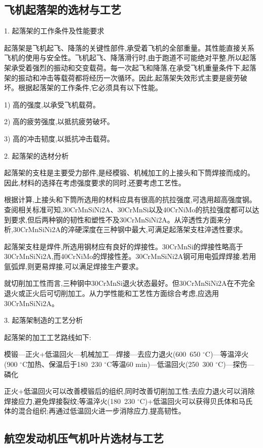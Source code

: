 \documentclass[UTF8]{ctexbook}
\newcommand{\◎}{\ensuremath{\bigcirc}}
\begin{document}
\subsection{飞机起落架的选材与工艺}

1. 起落架的工作条件及性能要求

起落架是飞机起飞、降落的关键性部件,承受着飞机的全部重量。其性能直接关系飞机的使用与安全性。飞机起飞、降落滑行时,由于跑道不可能绝对平整,所以起落架承受着强烈的振动和交变载荷。每一次起飞和降落,在承受飞机重量条件下,起落架的振动和冲击等载荷都将经历一次循环。因此,起落架失效形式主要是疲劳破坏。根据起落架的工作条件,它必须具有以下性能。

1) 高的强度,以承受飞机载荷。

2) 高的疲劳强度,以抵抗疲劳破坏。

3) 高的冲击韧度,以抵抗冲击载荷。

2. 起落架的选材分析

起落架的支柱是主要受力部件,是经模锻、机械加工的上接头和下筒焊接而成的。因此,材料的选择在考虑强度要求的同时,还要考虑工艺性。

根据计算,上接头和下筒所选用的材料应具有很高的抗拉强度,可选用超高强度钢。查阅相关标准可知,30CrMnSiNi2A、30CrMnSi以及40CrNiMo的抗拉强度都可以达到要求,但后两种钢的韧性和塑性不及30CrMnSiNi2A。从淬透性方面来分析,30CrMnSiNi2A的淬硬深度在三种钢中最大,可满足起落架支柱淬透性要求。

起落架支柱是焊件,所选用钢材应有良好的焊接性。30CrMnSi的焊接性略高于30CrMnSiNi2A,而40CrNiMo的焊接性差。30CrMnSiNi2A钢可用电弧焊焊接,若用氩弧焊,则更易焊接,可以满足焊接生产要求。

就切削加工性而言,三种钢中30CrMnSi退火状态最好。但30CrMnSiNi2A在不完全退火或正火后可切削加工。从力学性能和工艺性方面综合考虑,应选用30CrMnSiNi2A。

3. 起落架制造的工艺分析

起落架的加工工艺路线如下:

模锻—正火+低温回火—机械加工—焊接—去应力退火(600~650 $^\circ$C)—等温淬火(900 $^\circ$C加热、保温后于180~230 $^\circ$C等温60 min)—低温回火(250~300 $^\circ$C)—探伤—磷化

正火+低温回火可以改善模锻后的组织,同时改善切削加工性;去应力退火可以消除焊接应力,避免焊接裂纹;等温淬火(180~230 $^\circ$C)+低温回火可以获得贝氏体和马氏体的混合组织;再通过低温回火进一步消除应力,提高韧性。

\subsection{航空发动机压气机叶片选材与工艺}
\end{document}
